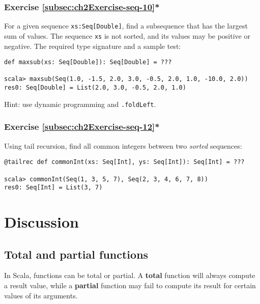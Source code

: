 \subsubsection{Exercise \label{subsec:ch2Exercise-seq-10}\ref{subsec:ch2Exercise-seq-10}{*}}

For a given sequence \lstinline!xs:Seq[Double]!, find a subsequence
that has the largest sum of values. The sequence \lstinline!xs! is
not sorted, and its values may be positive or negative. The required
type signature and a sample test:
\begin{lstlisting}
def maxsub(xs: Seq[Double]): Seq[Double] = ???

scala> maxsub(Seq(1.0, -1.5, 2.0, 3.0, -0.5, 2.0, 1.0, -10.0, 2.0))
res0: Seq[Double] = List(2.0, 3.0, -0.5, 2.0, 1.0)
\end{lstlisting}

Hint: use dynamic programming and \lstinline!.foldLeft!.

\subsubsection{Exercise \label{subsec:ch2Exercise-seq-12}\ref{subsec:ch2Exercise-seq-12}{*}}

Using tail recursion, find all common integers between two \emph{sorted}
sequences:
\begin{lstlisting}
@tailrec def commonInt(xs: Seq[Int], ys: Seq[Int]): Seq[Int] = ???

scala> commonInt(Seq(1, 3, 5, 7), Seq(2, 3, 4, 6, 7, 8))
res0: Seq[Int] = List(3, 7)
\end{lstlisting}


\section{Discussion}

\subsection{Total and partial functions}

In Scala, functions can be total or partial. A \textbf{total}
function will always compute a result value, while a \textbf{partial}
function may fail to compute its result for certain values of its
arguments.

